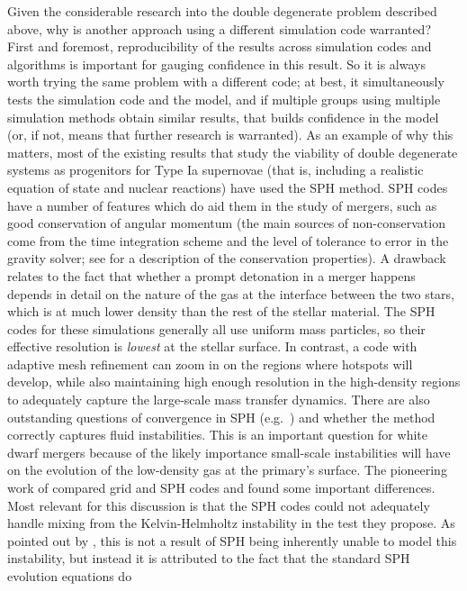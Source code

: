 \documentclass[12pt]{article}
\begin{document}
Given the considerable research into the double degenerate problem
described above, why is another approach using a different simulation
code warranted? First and foremost, reproducibility of the results
across simulation codes and algorithms is important for gauging
confidence in this result. So it is always worth trying the same
problem with a different code; at best, it simultaneously tests the
simulation code and the model, and if multiple groups using multiple
simulation methods obtain similar results, that builds confidence
in the model (or, if not, means that further research is warranted).
As an example of why this matters, most of the existing results that study
the viability of double degenerate systems as progenitors for
Type Ia supernovae (that is, including a realistic equation of state
and nuclear reactions) have used the SPH method. SPH codes have a
number of features which do aid them in the study of mergers, such
as good conservation of angular momentum (the main sources of non-conservation come
from the time integration scheme and the level of tolerance to error in the gravity
solver; see \citealt{rosswog:2009:rev} for a description of the conservation properties).
A drawback relates to the fact that whether a prompt detonation
in a merger happens depends in detail on the nature of the
gas at the interface between the two stars, which is at much lower
density than the rest of the stellar material. The SPH codes for these
simulations generally all use uniform mass particles, so their
effective resolution is \textit{lowest} at the stellar surface. In
contrast, a code with adaptive mesh refinement can zoom in on the regions
where hotspots will develop, while also maintaining high enough resolution
in the high-density regions to adequately capture the large-scale mass
transfer dynamics. There are also outstanding questions of convergence
in SPH (e.g.\ \citealt{zhu-SPH:2014}) and whether the method
correctly captures fluid instabilities. This is an important question
for white dwarf mergers because of the likely importance small-scale
instabilities will have on the evolution of the low-density gas at the
primary's surface. The pioneering work of \cite{agertz:2007} compared
grid and SPH codes and found some important differences. Most relevant
for this discussion is that the SPH codes could not adequately handle
mixing from the Kelvin-Helmholtz instability in the test they
propose. As pointed out by \cite{price:2008}, this is not a result of
SPH being inherently unable to model this instability, but instead it
is attributed to the fact that the standard SPH evolution equations do
\end{document}
